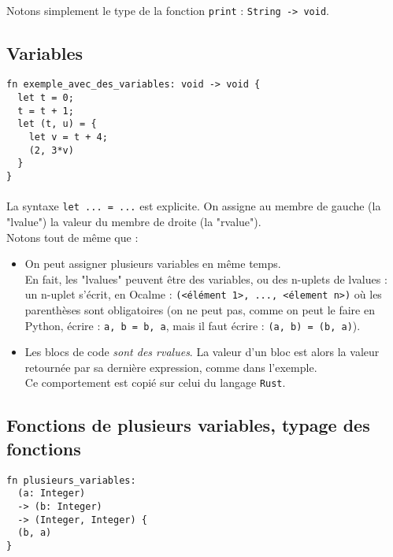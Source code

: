 \documentclass[french]{article}
\begin{document}
\paragraph{} Notons simplement le type de la fonction \verb|print| :
\verb|String -> void|.

\subsection{Variables}

\begin{lstlisting}
fn exemple_avec_des_variables: void -> void {
  let t = 0;
  t = t + 1;
  let (t, u) = {
    let v = t + 4;
    (2, 3*v)
  }
}
\end{lstlisting}

\paragraph{} La syntaxe \verb|let ... = ...| est explicite. On assigne
au membre de gauche (la "lvalue") la valeur du membre de droite (la
"rvalue"). \\
Notons tout de même que :
\begin{itemize}
  \item On peut assigner plusieurs variables en même temps. \\
  En fait, les "lvalues" peuvent être des variables, ou des n-uplets
  de lvalues : un n-uplet s'écrit, en Ocalme :
  \verb|(<élément 1>, ..., <élement n>)|
  où les parenthèses sont obligatoires (on ne peut pas, comme on peut
  le faire en Python, écrire : \verb|a, b = b, a|, mais il faut
  écrire : \verb|(a, b) = (b, a)|).

  \item Les blocs de code \emph{sont des rvalues}. La valeur d'un bloc
  est alors la valeur retournée par sa dernière expression, comme
  dans l'exemple. \\
  Ce comportement est copié sur celui du langage \verb|Rust|.
\end{itemize}

\subsection{Fonctions de plusieurs variables, typage des fonctions}

\begin{lstlisting}
fn plusieurs_variables:
  (a: Integer)
  -> (b: Integer)
  -> (Integer, Integer) {
  (b, a)
}
\end{lstlisting}
\end{document}

